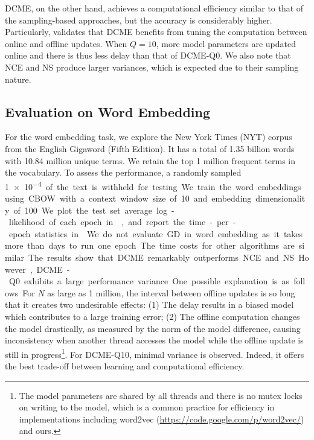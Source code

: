 DCME, on the other hand, achieves a computational efficiency similar to that of
the sampling-based approaches, but the accuracy is considerably higher.
Particularly,  validates that DCME benefits from
tuning the computation between online and offline updates. When $Q=10$, more
model parameters are updated online and there is thus less delay than that of
DCME-Q0. We also note that NCE and NS produce larger variances, which is
expected due to their sampling nature.

\subsection{Evaluation on Word Embedding}

For the word embedding task, we explore the New York Times (NYT) corpus from the
English Gigaword (Fifth Edition). It has a total of 1.35 billion words with
10.84 million unique terms. We retain the top 1 million frequent terms in the
vocabulary. To assess the performance, a randomly sampled \SI{1e-4} of the text
is withheld for testing. We train the word embeddings using CBOW with a context
window size of 10 and embedding dimensionality of 100.

We plot the test set average log-likelihood of each epoch in
, and report the time-per-epoch statistics in
. We do not evaluate GD in word embedding as it takes more
than days to run one epoch. The time costs for other algorithms are similar. The
results show that DCME remarkably outperforms NCE and NS.  However, DCME-Q0
exhibits a large performance variance. One possible explanation is as follows.
For $N$ as large as 1 million, the interval between offline updates is so long
that it creates two undesirable effects: (1) The delay results in a biased model
which contributes to a large training error; (2) The offline computation changes
the model drastically, as measured by the norm of the model difference, causing
inconsistency when another thread accesses the model while the offline update is
still in progress\footnote{The model parameters are shared by all threads and
  there is no mutex locks on writing to the model, which is a common practice
for efficiency in implementations including word2vec
  (\url{https://code.google.com/p/word2vec/}) and ours.}. For DCME-Q10, minimal
  variance is observed. Indeed, it offers the best trade-off between learning
  and computational efficiency.


